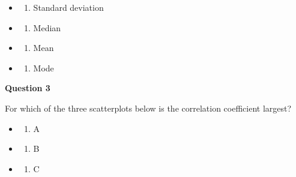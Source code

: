 \documentclass[
  letterpaper,
]{scrbook}
\providecommand{\tightlist}{%
  \setlength{\itemsep}{0pt}\setlength{\parskip}{0pt}}\usepackage{longtable,booktabs,array}
\begin{document}
\begin{itemize}
\item
  \begin{enumerate}
  \def\labelenumi{(\Alph{enumi})}
  \tightlist
  \item
    Standard deviation\\
  \end{enumerate}
\item
  \begin{enumerate}
  \def\labelenumi{(\Alph{enumi})}
  \setcounter{enumi}{1}
  \tightlist
  \item
    Median\\
  \end{enumerate}
\item
  \begin{enumerate}
  \def\labelenumi{(\Alph{enumi})}
  \setcounter{enumi}{2}
  \tightlist
  \item
    Mean\\
  \end{enumerate}
\item
  \begin{enumerate}
  \def\labelenumi{(\Alph{enumi})}
  \setcounter{enumi}{3}
  \tightlist
  \item
    Mode\\
  \end{enumerate}
\end{itemize}

\textbf{Question 3}

For which of the three scatterplots below is the correlation coefficient
largest?

\begin{itemize}
\item
  \begin{enumerate}
  \def\labelenumi{(\Alph{enumi})}
  \tightlist
  \item
    A\\
  \end{enumerate}
\item
  \begin{enumerate}
  \def\labelenumi{(\Alph{enumi})}
  \setcounter{enumi}{1}
  \tightlist
  \item
    B\\
  \end{enumerate}
\item
  \begin{enumerate}
  \def\labelenumi{(\Alph{enumi})}
  \setcounter{enumi}{2}
  \tightlist
  \item
    C
  \end{enumerate}
\end{itemize}
\end{document}
